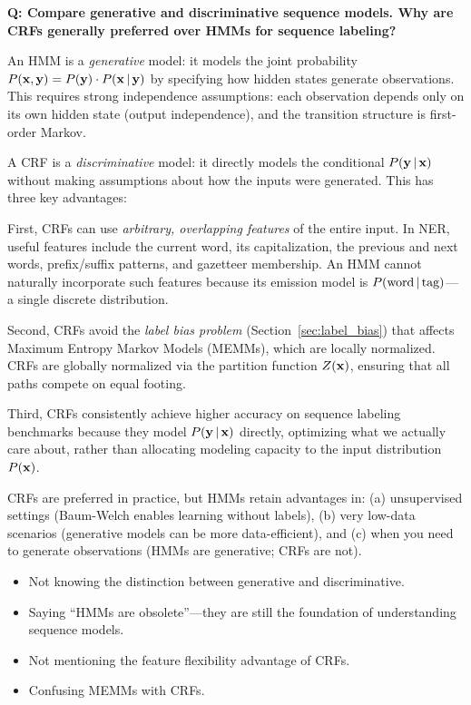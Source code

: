 \begin{interviewq}
\textbf{Q: Compare generative and discriminative sequence models.  Why are
CRFs generally preferred over HMMs for sequence labeling?}

 \quad {} \quad \badgefreq{\freqmed}

\stronganswer
An HMM is a \emph{generative} model: it models the joint probability
$P(\mathbf{x}, \mathbf{y}) = P(\mathbf{y}) \cdot P(\mathbf{x} \,|\, \mathbf{y})$ by specifying how hidden states
generate observations.  This requires strong independence assumptions: each
observation depends only on its own hidden state (output independence), and
the transition structure is first-order Markov.

A CRF is a \emph{discriminative} model: it directly models the conditional
$P(\mathbf{y} \,|\, \mathbf{x})$ without making assumptions about how the inputs were
generated.  This has three key advantages:

First, CRFs can use \emph{arbitrary, overlapping features} of the entire input.
In NER, useful features include the current word, its capitalization, the
previous and next words, prefix/suffix patterns, and gazetteer membership.  An
HMM cannot naturally incorporate such features because its emission model is
$P(\text{word} \,|\, \text{tag})$---a single discrete distribution.

Second, CRFs avoid the \emph{label bias problem}
(Section~\ref{sec:label_bias}) that affects Maximum Entropy Markov Models
(MEMMs), which are locally normalized.  CRFs are globally normalized via the
partition function $Z(\mathbf{x})$, ensuring that all paths compete on equal footing.

Third, CRFs consistently achieve higher accuracy on sequence labeling
benchmarks because they model $P(\mathbf{y} \,|\, \mathbf{x})$ directly, optimizing what
we actually care about, rather than allocating modeling capacity to the input
distribution $P(\mathbf{x})$.

CRFs are preferred in practice, but HMMs retain advantages in: (a) unsupervised
settings (Baum-Welch enables learning without labels), (b) very low-data
scenarios (generative models can be more data-efficient), and (c) when you
need to generate observations (HMMs are generative; CRFs are not).

\redflags
\begin{itemize}
    \item Not knowing the distinction between generative and discriminative.
    \item Saying ``HMMs are obsolete''---they are still the foundation of
          understanding sequence models.
    \item Not mentioning the feature flexibility advantage of CRFs.
    \item Confusing MEMMs with CRFs.
\end{itemize}


\end{interviewq}

